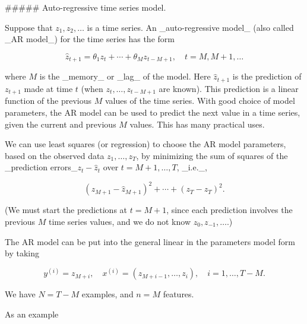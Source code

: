 
##### Auto-regressive time series model.

Suppose that \(z_{1},z_{2},\ldots\) is a time series. An _auto-regressive model_ (also called _AR model_) for the time series has the form

\[\hat{z}_{t+1}=\theta_{1}z_{t}+\cdots+\theta_{M}z_{t-M+1},\quad t=M,M+1,\ldots\]

where \(M\) is the _memory_ or _lag_ of the model. Here \(\hat{z}_{t+1}\) is the prediction of \(z_{t+1}\) made at time \(t\) (when \(z_{t},\ldots,z_{t-M+1}\) are known). This prediction is a linear function of the previous \(M\) values of the time series. With good choice of model parameters, the AR model can be used to predict the next value in a time series, given the current and previous \(M\) values. This has many practical uses.

We can use least squares (or regression) to choose the AR model parameters, based on the observed data \(z_{1},\ldots,z_{T}\), by minimizing the sum of squares of the _prediction errors_\(z_{t}-\hat{z}_{t}\) over \(t=M+1,\ldots,T\), _i.e._,

\[(z_{M+1}-\hat{z}_{M+1})^{2}+\cdots+(z_{T}-\hat{z}_{T})^{2}.\]

(We must start the predictions at \(t=M+1\), since each prediction involves the previous \(M\) time series values, and we do not know \(z_{0},z_{-1},\ldots\).)

The AR model can be put into the general linear in the parameters model form by taking

\[y^{(i)}=z_{M+i},\quad x^{(i)}=(z_{M+i-1},\ldots,z_{i}),\quad i=1,\ldots,T-M.\]

We have \(N=T-M\) examples, and \(n=M\) features.

As an example 